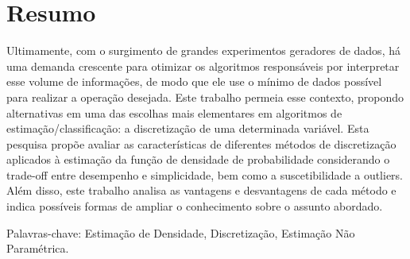 %
%
\chapter*{Resumo}
\vspace{-2cm}

\noindent 
\vspace{0.5cm}

Ultimamente, com o surgimento de grandes experimentos geradores de dados, há uma demanda crescente para otimizar os algoritmos responsáveis por interpretar esse volume de informações, de modo que ele use o mínimo de dados possível para realizar a operação desejada. Este trabalho permeia esse contexto, propondo alternativas em uma das escolhas mais elementares em algoritmos de estimação/classificação: a discretização de uma determinada variável. Esta pesquisa propõe avaliar as características de diferentes métodos de discretização aplicados à estimação da função de densidade de probabilidade considerando o trade-off entre desempenho e simplicidade, bem como a suscetibilidade a outliers. Além disso, este trabalho analisa as vantagens e desvantagens de cada método e indica possíveis formas de ampliar o conhecimento sobre o assunto abordado.

\noindent Palavras-chave:  Estimação de Densidade, Discretização, Estimação Não Paramétrica.\\

\newpage


